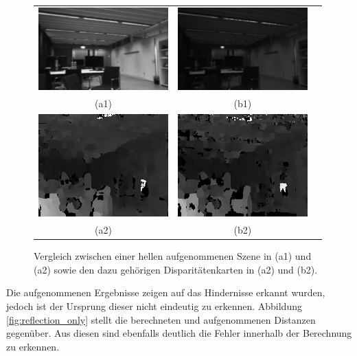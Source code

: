 \begin{figure}[h]
	\centering
	\begin{tabular}{ccc}
		\includegraphics[width=5cm]{img/brightness/bright_left} &
		\includegraphics[width=5cm]{img/brightness/middle_left} \\
		(a1) &
		(b1)\\
		\includegraphics[width=5cm]{img/brightness/bright_dis} &
		\includegraphics[width=5cm]{img/brightness/middle_dis} \\
		(a2) &
		(b2)
	\end{tabular}
	\caption{Vergleich zwischen einer hellen aufgenommenen Szene in (a1) und (a2) sowie den dazu gehörigen Disparitätenkarten in (a2) und (b2).}
	\label{fig:dark_disparity}
\end{figure}

\noindent
Die aufgenommenen Ergebnisse zeigen auf das Hindernisse erkannt wurden, jedoch ist der Ursprung dieser nicht eindeutig zu erkennen. Abbildung \ref{fig:reflection_only} stellt die berechneten und aufgenommenen Distanzen gegenüber. Aus diesen sind ebenfalls deutlich die Fehler innerhalb der Berechnung zu erkennen.\\


